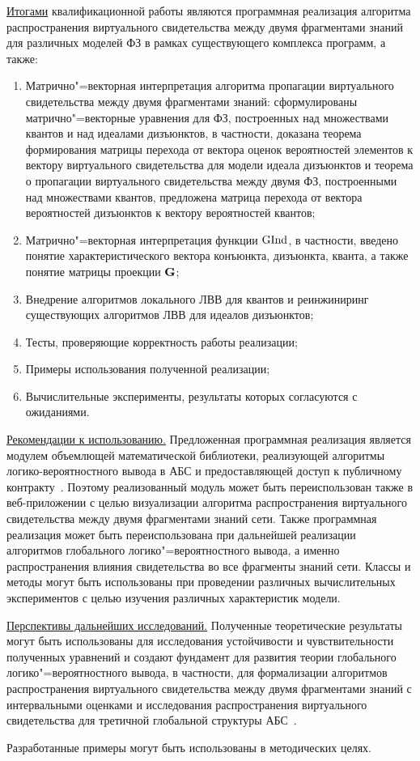 \underline{Итогами}  квалификационной работы являются программная реализация алгоритма распространения виртуального свидетельства между двумя фрагментами знаний для различных моделей ФЗ в рамках существующего комплекса программ, а также:
\begin{enumerate}
    \item  Матрично"=векторная интерпретация алгоритма пропагации виртуального свидетельства между двумя фрагментами знаний: сформулированы матрично"=векторные уравнения для ФЗ, построенных над множествами квантов и над идеалами дизъюнктов, в частности, доказана теорема формирования матрицы перехода от вектора оценок вероятностей элементов к вектору виртуального свидетельства для модели идеала дизъюнктов и теорема о пропагации виртуального свидетельства между двумя ФЗ, построенными над множествами квантов, предложена матрица перехода от вектора вероятностей дизъюнктов к вектору вероятностей квантов; 
    \item Матрично"=векторная интерпретация функции $\mathrm{GInd}$, в частности, введено понятие характеристического вектора конъюнкта, дизъюнкта, кванта, а также понятие матрицы проекции $\mathbf{G}$;
    \item Внедрение алгоритмов локального ЛВВ для квантов и реинжиниринг существующих алгоритмов ЛВВ для идеалов дизъюнктов;
    \item Тесты, проверяющие корректность работы реализации;
    \item Примеры использования полученной реализации; 
    \item Вычислительные эксперименты, результаты которых согласуются с ожиданиями.
\end{enumerate}

\underline{Рекомендации к использованию.} Предложенная программная реализация является модулем объемлющей математической библиотеки, реализующей алгоритмы логико-вероятностного вывода в АБС и предоставляющей доступ к публичному контракту~\cite{50}. Поэтому реализованный модуль может быть переиспользован также в веб-приложении с целью визуализации алгоритма распространения виртуального свидетельства между двумя фрагментами знаний сети. Также программная реализация может быть переиспользована при дальнейшей реализации алгоритмов глобального логико"=вероятностного вывода, а именно распространения влияния свидетельства во все фрагменты знаний сети. Классы и методы могут быть использованы при проведении различных вычислительных экспериментов с целью изучения различных характеристик модели.

\underline{Перспективы дальнейших исследований.} Полученные теоретические результаты могут быть использованы для исследования устойчивости и чувствительности полученных уравнений и создают фундамент для развития теории глобального логико"=вероятностного вывода, в частности, для формализации алгоритмов распространения виртуального свидетельства между двумя фрагментами знаний с интервальными оценками и исследования распространения виртуального свидетельства для третичной глобальной структуры АБС~\cite{284}.

Разработанные примеры могут быть использованы в методических целях.
